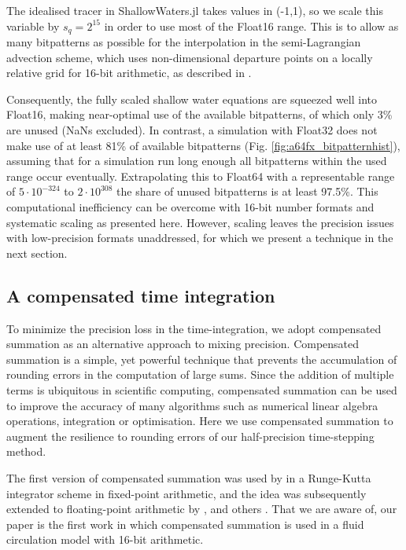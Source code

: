 The idealised tracer in ShallowWaters.jl takes values in (-1,1), so we scale this variable by $s_q = 2^{15}$
in order to use most of the Float16 range. This is to allow as many bitpatterns as possible for the interpolation
in the semi-Lagrangian advection scheme, which uses non-dimensional departure points on a locally relative
grid for 16-bit arithmetic, as described in \cite{Klower2020b}.

Consequently, the fully scaled shallow water equations are squeezed well into Float16, making near-optimal
use of the available bitpatterns, of which only 3\% are unused (NaNs excluded). In contrast, a simulation with
Float32 does not make use of at least 81\% of available bitpatterns (Fig. \ref{fig:a64fx_bitpatternhist}), assuming
that for a simulation run long enough all bitpatterns within the used range occur eventually. Extrapolating this
to Float64 with a representable range of $5 \cdot 10^{-324}$ to $2 \cdot 10^{308}$ the share of unused bitpatterns
is at least 97.5\%. This computational inefficiency can be overcome with 16-bit number formats and systematic
scaling as presented here. However, scaling leaves the precision issues with low-precision formats unaddressed,
for which we present a technique in the next section.

\subsection{A compensated time integration}
\label{sec:compensated_time_integration}

To minimize the precision loss in the time-integration, we adopt compensated summation as an alternative approach
to mixing precision. Compensated summation is a simple, yet powerful technique that prevents the accumulation of
rounding errors in the computation of large sums. Since the addition of multiple terms is ubiquitous in scientific computing,
compensated summation can be used to improve the accuracy of many algorithms such as numerical linear algebra
operations, integration or optimisation. Here we use compensated summation to augment the resilience to rounding
errors of our half-precision time-stepping method. 

The first version of compensated summation was used by \cite{Gill1951} in a Runge-Kutta integrator scheme in
fixed-point arithmetic, and the idea was subsequently extended to floating-point arithmetic by \cite{Kahan1965},
\cite{Moller1965} and others \citep{Vitasek1969,Linnainmaa1974,Higham1993}. That we are aware of, our paper
is the first work in which compensated summation is used in a fluid circulation model with 16-bit arithmetic.

